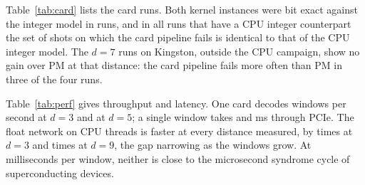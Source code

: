Table~\ref{tab:card} lists the \CardConfigs{} card runs. Both kernel instances were bit exact against the integer
model in \CardAllExact{} runs, and in all \CardCompared{} runs that have a CPU integer counterpart the set of shots
on which the card pipeline fails is identical to that of the CPU integer model. The $d = 7$ runs on
Kingston, outside the CPU campaign, show no gain over PM at that distance: the card pipeline fails more often than
PM in three of the four runs.

\begin{table}[t]
\caption{Card runs: logical failures of PM and of the card's INT8 decisions followed by PM on the same 200,000 shots,
and whether the failing shots equal those of the CPU integer model (n/a: no CPU integer run at that
point).}\label{tab:card}
\centering

\end{table}

Table~\ref{tab:perf} gives throughput and latency. One card decodes \CardRateDd{} windows per second at $d = 3$ and
\CardRateDf{} at $d = 5$; a single window takes \CardLatDd{} and \CardLatDf{} ms through PCIe. The float network on
\CpuThreads{} CPU threads is faster at every distance measured, by \CpuOverCardDd{} times at $d = 3$ and
\CpuOverCardDj{} times at $d = 9$, the gap narrowing as the windows grow. At milliseconds per window, neither is
close to the microsecond syndrome cycle of superconducting devices.

\begin{table}[t]
\caption{Throughput of one card (both kernel instances) and latency of one window, against the float network on the
CPU host (forward pass only, batches of 4,096).}\label{tab:perf}
\centering

\end{table}
